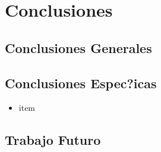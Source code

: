 \chapter{Conclusiones}
\label{ch:conc}
\section{Conclusiones Generales}

\section{Conclusiones Espec?icas}
\begin{itemize}
\item item
\end{itemize}


\section{Trabajo Futuro}

